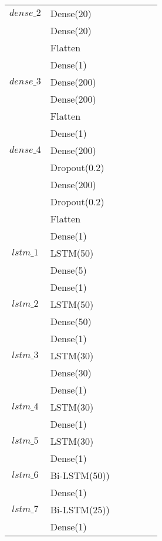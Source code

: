 \begin{longtable}{| c | m{0.58\linewidth} | r | m{0.1\linewidth} |}
    $dense\_2$  & Dense(20)                 \\
                & Dense(20)                 \\
                & Flatten                   \\
                & Dense(1)                  \\ \hline

    $dense\_3$  & Dense(200)                \\
                & Dense(200)                \\
                & Flatten                   \\
                & Dense(1)                  \\ \hline

    $dense\_4$  & Dense(200)                \\
                & Dropout(0.2)              \\
                & Dense(200)                \\
                & Dropout(0.2)              \\
                & Flatten                   \\
                & Dense(1)                  \\ \hline
    $lstm\_1$   & LSTM(50)                  \\
                & Dense(5)                  \\
                & Dense(1)                  \\ \hline

    $lstm\_2$   & LSTM(50)                  \\
                & Dense(50)                 \\
                & Dense(1)                  \\ \hline

    $lstm\_3$   & LSTM(30)                  \\
                & Dense(30)                 \\
                & Dense(1)                  \\ \hline
    $lstm\_4$   & LSTM(30)                  \\
                & Dense(1)                  \\ \hline
    $lstm\_5$   & LSTM(30)                  \\
                & Dense(1)                  \\ \hline
    $lstm\_6$   & Bi-LSTM(50))              \\
                & Dense(1)                  \\ \hline
    $lstm\_7$   & Bi-LSTM(25))              \\
                & Dense(1)                  \\ \hline


\end{longtable}
